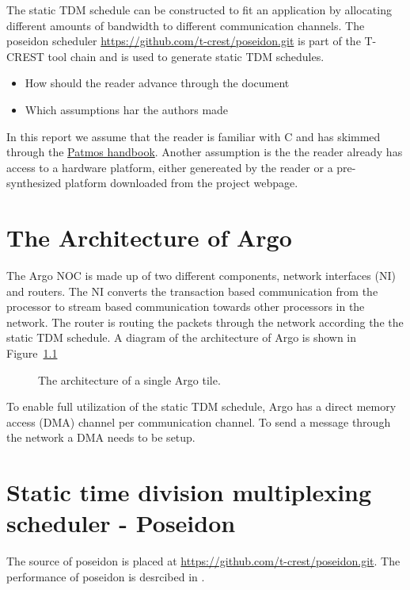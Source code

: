 \documentclass[a4paper,fontsize=10pt,twoside,DIV15,BCOR12mm,headinclude=true,footinclude=false,pagesize,bibtotoc]{scrbook}
\begin{document}
The static TDM schedule can be constructed to fit an application by allocating different amounts of bandwidth to different communication channels.
The poseidon scheduler \url{https://github.com/t-crest/poseidon.git} is part of the T-CREST tool chain and is used to generate static TDM schedules.

\begin{itemize}
\item How should the reader advance through the document
\item Which assumptions har the authors made
\end{itemize}

In this report we assume that the reader is familiar with C and has skimmed through the \href{http://patmos.compute.dtu.dk/patmos_handbook.pdf}{Patmos handbook}.
Another assumption is the the reader already has access to a hardware platform, either genereated by the reader or a pre-synthesized platform downloaded from the project webpage.




\chapter{The Architecture of Argo}
\label{sec:arch}

The Argo NOC is made up of two different components,
network interfaces (NI) and routers.
The NI converts the transaction based communication from the processor to
stream based communication towards other processors in the network.
The router is routing the packets through the network according the the static TDM schedule.
A diagram of the architecture of Argo is shown in Figure~\ref{fig:diag}

\begin{figure}
\label{fig:diag}
\centering
\caption{The architecture of a single Argo tile.}
\end{figure}

To enable full utilization of the static TDM schedule,
Argo has a direct memory access (DMA) channel per communication channel.
To send a message through the network a DMA needs to be setup.


\chapter{Static time division multiplexing scheduler - Poseidon}
The source of poseidon is placed at \url{https://github.com/t-crest/poseidon.git}.
The performance of poseidon is desrcibed in \cite{}.%
\end{document}
